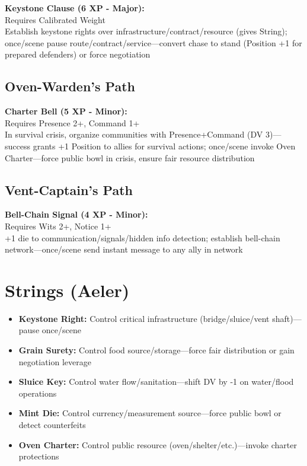 \documentclass[11pt]{book}
\newcommand{\talent}[1]{\textbf{#1}}
\newcommand{\stringtype}[1]{\textbf{#1}}
\begin{document}
\talent{Keystone Clause (6 XP - Major):} \\
Requires Calibrated Weight \\
Establish keystone rights over infrastructure/contract/resource (gives String); once/scene pause route/contract/service---convert chase to stand (Position +1 for prepared defenders) or force negotiation

\subsection*{Oven-Warden's Path}
\talent{Charter Bell (5 XP - Minor):} \\
Requires Presence 2+, Command 1+ \\
In survival crisis, organize communities with Presence+Command (DV 3)---success grants +1 Position to allies for survival actions; once/scene invoke Oven Charter---force public bowl in crisis, ensure fair resource distribution

\subsection*{Vent-Captain's Path}
\talent{Bell-Chain Signal (4 XP - Minor):} \\
Requires Wits 2+, Notice 1+ \\
+1 die to communication/signals/hidden info detection; establish bell-chain network---once/scene send instant message to any ally in network

\section{Strings (Aeler)}
\begin{itemize}
    \item \stringtype{Keystone Right:} Control critical infrastructure (bridge/sluice/vent shaft)---pause once/scene
    \item \stringtype{Grain Surety:} Control food source/storage---force fair distribution or gain negotiation leverage
    \item \stringtype{Sluice Key:} Control water flow/sanitation---shift DV by -1 on water/flood operations
    \item \stringtype{Mint Die:} Control currency/measurement source---force public bowl or detect counterfeits
    \item \stringtype{Oven Charter:} Control public resource (oven/shelter/etc.)---invoke charter protections
\end{itemize}
\end{document}
